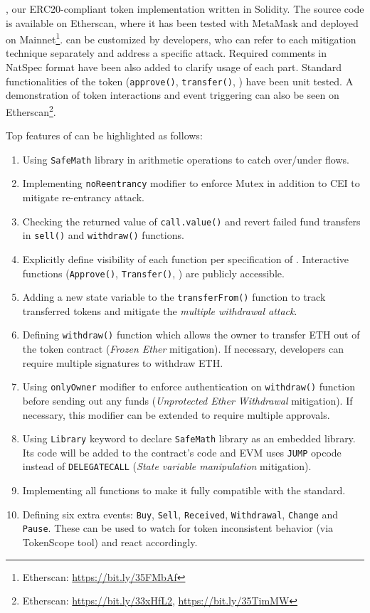 \sys, our ERC20-compliant token implementation written in Solidity. The source code is available on Etherscan, where it has been tested with MetaMask and deployed on Mainnet\footnote{Etherscan: \url{https://bit.ly/35FMbAf}}. \sys can be customized by developers, who can refer to each mitigation technique separately and address a specific attack. Required comments in NatSpec format\cite{NatSpec} have been also added to clarify usage of each part. Standard functionalities of the token (\ie \texttt{approve()}, \texttt{transfer()}, \etc) have been unit tested. A demonstration of token interactions and event triggering can also be seen on Etherscan\footnote{Etherscan: \url{https://bit.ly/33xHfL2}, \url{https://bit.ly/35TimMW}}. {\blue Top features of \sys can be highlighted as follows:
\begin{enumerate}[noitemsep,topsep=0pt]
	\item Using \texttt{SafeMath} library in arithmetic operations to catch over/under flows.
	\item Implementing \texttt{noReentrancy} modifier to enforce Mutex in addition to CEI to mitigate re-entrancy attack.
	\item Checking the returned value of \texttt{call.value()} and revert failed fund transfers in \texttt{sell()} and \texttt{withdraw()} functions.
	\item Explicitly define visibility of each function per specification of \erc. Interactive functions (\eg \texttt{Approve()}, \texttt{Transfer()}, \etc) are publicly accessible.
	\item Adding a new state variable to the \texttt{transferFrom()} function to track transferred tokens and mitigate the \textit{multiple withdrawal attack}. 
	\item Defining \texttt{withdraw()} function which allows the owner to transfer ETH out of the token contract (\textit{Frozen Ether} mitigation). If necessary, developers can require multiple signatures to withdraw ETH.
	\item Using \texttt{onlyOwner} modifier to enforce authentication on \texttt{withdraw()} function before sending out any funds (\textit{Unprotected Ether Withdrawal} mitigation). If necessary, this modifier can be extended to require multiple approvals.
	\item Using \texttt{Library} keyword to declare \texttt{SafeMath} library as an embedded library. Its code will be added to the \erc contract's code and EVM uses \texttt{JUMP} opcode instead of \texttt{DELEGATECALL} (\textit{State variable manipulation} mitigation).
	\item Implementing all functions to make it fully compatible with the standard.
	\item Defining six extra events: \texttt{Buy}, \texttt{Sell}, \texttt{Received}, \texttt{Withdrawal}, \texttt{Change} and \texttt{Pause}. These can be used to watch for token inconsistent behavior (\eg via TokenScope tool\cite{TokenScope}) and react accordingly.
\end{enumerate}

}
